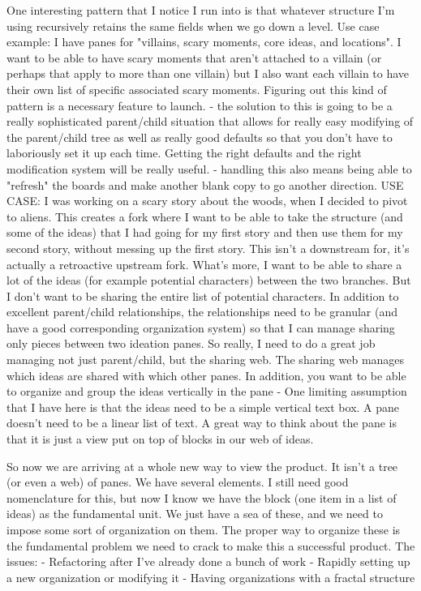 One interesting pattern that I notice I run into is that whatever structure I'm using recursively retains the same fields when we go down a level. Use case example: I have panes for "villains, scary moments, core ideas, and locations". I want to be able to have scary moments that aren't attached to a villain (or perhaps that apply to more than one villain) but I also want each villain to have their own list of specific associated scary moments. Figuring out this kind of pattern is a necessary feature to launch.
- the solution to this is going to be a really sophisticated parent/child situation that allows for really easy modifying of the parent/child tree as well as really good defaults so that you don't have to laboriously set it up each time. Getting the right defaults and the right modification system will be really useful.
- handling this also means being able to "refresh" the boards and make another blank copy to go another direction. USE CASE: I was working on a scary story about the woods, when I decided to pivot to aliens. This creates a fork where I want to be able to take the structure (and some of the ideas) that I had going for my first story and then use them for my second story, without messing up the first story. This isn't a downstream for, it's actually a retroactive upstream fork. What's more, I want to be able to share a lot of the ideas (for example potential characters) between the two branches. But I don't want to be sharing the entire list of potential characters. In addition to excellent parent/child relationships, the relationships need to be granular (and have a good corresponding organization system) so that I can manage sharing only pieces between two ideation panes. So really, I need to do a great job managing not just parent/child, but the sharing web. The sharing web manages which ideas are shared with which other panes. In addition, you want to be able to organize and group the ideas vertically in the pane
- One limiting assumption that I have here is that the ideas need to be a simple vertical text box. A pane doesn't need to be a linear list of text. A great way to think about the pane is that it is just a view put on top of blocks in our web of ideas.

So now we are arriving at a whole new way to view the product. It isn't a tree (or even a web) of panes. We have several elements. I still need good nomenclature for this, but now I know we have the block (one item in a list of ideas) as the fundamental unit. We just have a sea of these, and we need to impose some sort of organization on them.  The proper way to organize these is the fundamental problem we need to crack to make this a successful product. The issues:
- Refactoring after I've already done a bunch of work
- Rapidly setting up a new organization or modifying it
- Having organizations with a fractal structure


